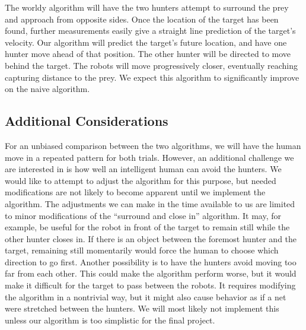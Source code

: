 \documentclass[conference]{IEEEtran}
\begin{document}
The worldy algorithm will have the two hunters attempt to surround the prey and approach from opposite sides.
Once the location of the target has been found, further measurements easily give a straight line prediction of the target's velocity.
Our algorithm will predict the target's future location, and have one hunter move ahead of that position.
The other hunter will be directed to move behind the target.
The robots will move progressively closer, eventually reaching capturing distance to the prey.
We expect this algorithm to significantly improve on the naive algorithm.

\subsection{Additional Considerations}
For an unbiased comparison between the two algorithms, we will have the human move in a repeated pattern for both trials.
However, an additional challenge we are interested in is how well an intelligent human can avoid the hunters.
We would like to attempt to adjust the algorithm for this purpose, but needed modifications are not likely to become apparent until we implement the algorithm.
The adjustments we can make in the time available to us are limited to minor modifications of the ``surround and close in'' algorithm.
It may, for example, be useful for the robot in front of the target to remain still while the other hunter closes in.
If there is an object between the foremost hunter and the target, remaining still momentarily would force the human to choose which direction to go first.
Another possibility is to have the hunters avoid moving too far from each other.
This could make the algorithm perform worse, but it would make it difficult for the target to pass between the robots.
It requires modifying the algorithm in a nontrivial way, but it might also cause behavior as if a net were stretched between the hunters.
We will most likely not implement this unless our algorithm is too simplistic for the final project.




\end{document}
